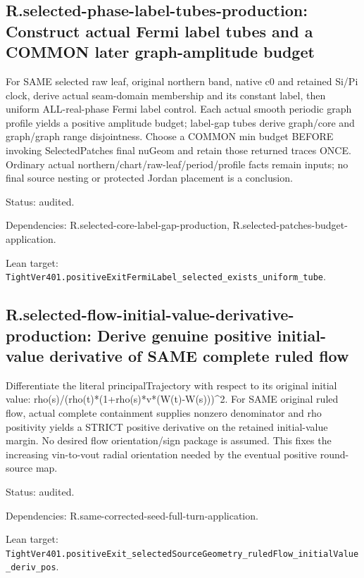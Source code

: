 \documentclass{article}
\begin{document}
\subsection*{R.selected-phase-label-tubes-production: Construct actual Fermi label tubes and a COMMON later graph-amplitude budget}
For SAME selected raw leaf, original northern band, native c0 and retained Si/Pi clock, derive actual seam-domain membership and its constant label, then uniform ALL-real-phase Fermi label control. Each actual smooth periodic graph profile yields a positive amplitude budget; label-gap tubes derive graph/core and graph/graph range disjointness. Choose a COMMON min budget BEFORE invoking SelectedPatches final nuGeom and retain those returned traces ONCE. Ordinary actual northern/chart/raw-leaf/period/profile facts remain inputs; no final source nesting or protected Jordan placement is a conclusion.
\par Status: audited.
\par Dependencies: R.selected-core-label-gap-production, R.selected-patches-budget-application.
\par Lean target: \texttt{TightVer401.positiveExitFermiLabel\_selected\_exists\_uniform\_tube}.
\subsection*{R.selected-flow-initial-value-derivative-production: Derive genuine positive initial-value derivative of SAME complete ruled flow}
Differentiate the literal principalTrajectory with respect to its original initial value: rho(s)/(rho(t)*(1+rho(s)*v*(W(t)-W(s)))^2. For SAME original ruled flow, actual complete containment supplies nonzero denominator and rho positivity yields a STRICT positive derivative on the retained initial-value margin. No desired flow orientation/sign package is assumed. This fixes the increasing vin-to-vout radial orientation needed by the eventual positive round-source map.
\par Status: audited.
\par Dependencies: R.same-corrected-seed-full-turn-application.
\par Lean target: \texttt{TightVer401.positiveExit\_selectedSourceGeometry\_ruledFlow\_initialValue\_deriv\_pos}.
\end{document}

